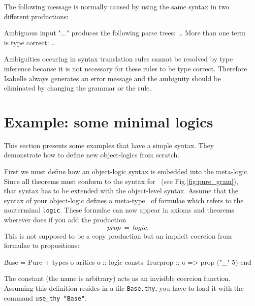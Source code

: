 The following message is normally caused by using the same
syntax in two different productions:

\begin{ttbox}
{\out Ambiguous input "..."}
{\out produces the following parse trees:}
{\out \dots}
{\out More than one term is type correct:}
{\out \dots}
\end{ttbox}

Ambiguities occuring in syntax translation rules cannot be resolved by
type inference because it is not necessary for these rules to be type
correct.  Therefore Isabelle always generates an error message and the
ambiguity should be eliminated by changing the grammar or the rule.


\section{Example: some minimal logics} \label{sec:min_logics}

This section presents some examples that have a simple syntax.  They
demonstrate how to define new object-logics from scratch.

First we must define how an object-logic syntax is embedded into the
meta-logic.  Since all theorems must conform to the syntax for~
(see Fig.\ts\ref{fig:pure_gram}), that syntax has to be extended with the
object-level syntax.  Assume that the syntax of your object-logic defines a
meta-type~ of formulae which refers to the nonterminal {\tt logic}.
These formulae can now appear in axioms and theorems wherever  does
if you add the production
\[ prop ~=~ logic. \]
This is not supposed to be a copy production but an implicit coercion from
formulae to propositions:
\begin{ttbox}
Base = Pure +
types
  o
arities
  o :: logic
consts
  Trueprop :: o => prop   ("_" 5)
end
\end{ttbox}
The constant  (the name is arbitrary) acts as an invisible
coercion function.  Assuming this definition resides in a file {\tt Base.thy},
you have to load it with the command {\tt use_thy "Base"}.

